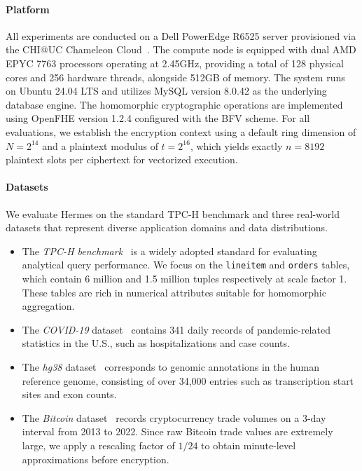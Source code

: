 \documentclass[sigconf,nonacm]{acmart}
\begin{document}
\paragraph{Platform}
All experiments are conducted on a Dell PowerEdge R6525 server provisioned via the CHI@UC Chameleon Cloud~\cite{chameleoncloud}. The compute node is equipped with dual AMD EPYC 7763 processors operating at 2.45GHz, providing a total of 128 physical cores and 256 hardware threads, alongside 512GB of memory. The system runs on Ubuntu 24.04 LTS and utilizes MySQL version 8.0.42 as the underlying database engine. The homomorphic cryptographic operations are implemented using OpenFHE version 1.2.4 configured with the BFV scheme. For all evaluations, we establish the encryption context using a default ring dimension of $N=2^{14}$ and a plaintext modulus of $t=2^{16}$, which yields exactly $n=8192$ plaintext slots per ciphertext for vectorized execution.

\paragraph{Datasets}
We evaluate Hermes on the standard TPC-H benchmark and three real-world datasets that represent diverse application domains and data distributions. 
\begin{itemize}
  \item The \emph{TPC-H benchmark}~\cite{tpch3} is a widely adopted standard for evaluating analytical query performance. We focus on the \texttt{lineitem} and \texttt{orders} tables, which contain 6 million and 1.5 million tuples respectively at scale factor 1. These tables are rich in numerical attributes suitable for homomorphic aggregation.
  \item The \textit{COVID-19} dataset~\cite{covid19data} contains 341 daily records of pandemic-related statistics in the U.S., such as hospitalizations and case counts. 
  \item The \textit{hg38} dataset~\cite{hg_data} corresponds to genomic annotations in the human reference genome, consisting of over 34,000 entries such as transcription start sites and exon counts. 
  \item The \textit{Bitcoin} dataset~\cite{bitcoin_trade} records cryptocurrency trade volumes on a 3-day interval from 2013 to 2022. Since raw Bitcoin trade values are extremely large, we apply a rescaling factor of $1/24$ to obtain minute-level approximations before encryption.
\end{itemize}
\end{document}
